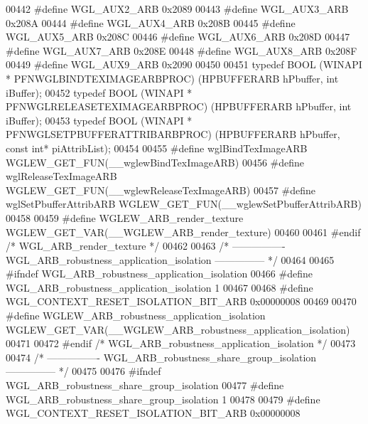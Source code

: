 \begin{DoxyCode}
00442 \textcolor{preprocessor}{#define WGL\_AUX2\_ARB 0x2089}
00443 \textcolor{preprocessor}{#define WGL\_AUX3\_ARB 0x208A}
00444 \textcolor{preprocessor}{#define WGL\_AUX4\_ARB 0x208B}
00445 \textcolor{preprocessor}{#define WGL\_AUX5\_ARB 0x208C}
00446 \textcolor{preprocessor}{#define WGL\_AUX6\_ARB 0x208D}
00447 \textcolor{preprocessor}{#define WGL\_AUX7\_ARB 0x208E}
00448 \textcolor{preprocessor}{#define WGL\_AUX8\_ARB 0x208F}
00449 \textcolor{preprocessor}{#define WGL\_AUX9\_ARB 0x2090}
00450 
00451 \textcolor{keyword}{typedef} BOOL (WINAPI * PFNWGLBINDTEXIMAGEARBPROC) (HPBUFFERARB hPbuffer, \textcolor{keywordtype}{int} 
      iBuffer);
00452 \textcolor{keyword}{typedef} BOOL (WINAPI * PFNWGLRELEASETEXIMAGEARBPROC) (HPBUFFERARB hPbuffer, \textcolor{keywordtype}{int} 
      iBuffer);
00453 \textcolor{keyword}{typedef} BOOL (WINAPI * PFNWGLSETPBUFFERATTRIBARBPROC) (HPBUFFERARB hPbuffer, \textcolor{keyword}{const} \textcolor{keywordtype}{int}* 
      piAttribList);
00454 
00455 \textcolor{preprocessor}{#define wglBindTexImageARB WGLEW\_GET\_FUN(\_\_wglewBindTexImageARB)}
00456 \textcolor{preprocessor}{#define wglReleaseTexImageARB WGLEW\_GET\_FUN(\_\_wglewReleaseTexImageARB)}
00457 \textcolor{preprocessor}{#define wglSetPbufferAttribARB WGLEW\_GET\_FUN(\_\_wglewSetPbufferAttribARB)}
00458 
00459 \textcolor{preprocessor}{#define WGLEW\_ARB\_render\_texture WGLEW\_GET\_VAR(\_\_WGLEW\_ARB\_render\_texture)}
00460 
00461 \textcolor{preprocessor}{#endif }\textcolor{comment}{/* WGL\_ARB\_render\_texture */}\textcolor{preprocessor}{}
00462 
00463 \textcolor{comment}{/* ---------------- WGL\_ARB\_robustness\_application\_isolation --------------- */}
00464 
00465 \textcolor{preprocessor}{#ifndef WGL\_ARB\_robustness\_application\_isolation}
00466 \textcolor{preprocessor}{#define WGL\_ARB\_robustness\_application\_isolation 1}
00467 
00468 \textcolor{preprocessor}{#define WGL\_CONTEXT\_RESET\_ISOLATION\_BIT\_ARB 0x00000008}
00469 
00470 \textcolor{preprocessor}{#define WGLEW\_ARB\_robustness\_application\_isolation
       WGLEW\_GET\_VAR(\_\_WGLEW\_ARB\_robustness\_application\_isolation)}
00471 
00472 \textcolor{preprocessor}{#endif }\textcolor{comment}{/* WGL\_ARB\_robustness\_application\_isolation */}\textcolor{preprocessor}{}
00473 
00474 \textcolor{comment}{/* ---------------- WGL\_ARB\_robustness\_share\_group\_isolation --------------- */}
00475 
00476 \textcolor{preprocessor}{#ifndef WGL\_ARB\_robustness\_share\_group\_isolation}
00477 \textcolor{preprocessor}{#define WGL\_ARB\_robustness\_share\_group\_isolation 1}
00478 
00479 \textcolor{preprocessor}{#define WGL\_CONTEXT\_RESET\_ISOLATION\_BIT\_ARB 0x00000008}

\end{DoxyCode}
